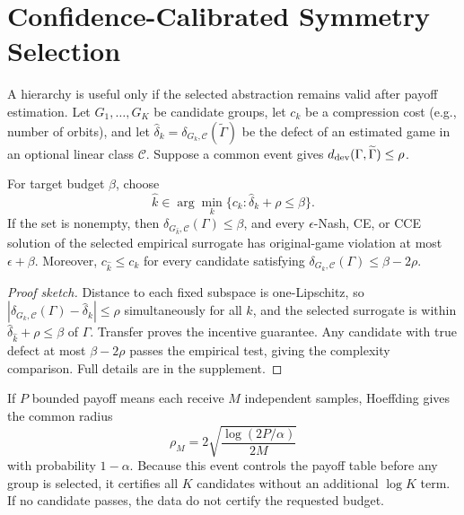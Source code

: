 \section{Confidence-Calibrated Symmetry Selection}

A hierarchy is useful only if the selected abstraction remains valid after payoff estimation.  Let $G_1,\ldots,G_K$ be candidate groups, let $c_k$ be a compression cost (e.g., number of orbits), and let
$\widehat\delta_k=\delta_{G_k,\mathcal C}(\widetilde\Gamma)$ be the defect of an estimated game in an optional linear class $\mathcal C$.  Suppose a common event gives
$d_{\mathrm{dev}}(\Gamma,\widetilde\Gamma)\le\rho$.

\begin{theorem}
\label{thm:group-selection}
For target budget $\beta$, choose
\begin{equation}
\widehat k\in\arg\min_k
\{c_k:\widehat\delta_k+\rho\le\beta\}.
\label{eq:group-selection}
\end{equation}
If the set is nonempty, then
$\delta_{G_{\widehat k},\mathcal C}(\Gamma)\le\beta$, and every $\epsilon$-Nash, CE, or CCE solution of the selected empirical surrogate has original-game violation at most $\epsilon+\beta$.  Moreover,
$c_{\widehat k}\le c_k$ for every candidate satisfying
$\delta_{G_k,\mathcal C}(\Gamma)\le\beta-2\rho$.
\end{theorem}
\begin{proof}[Proof sketch]
Distance to each fixed subspace is one-Lipschitz, so
$|\delta_{G_k,\mathcal C}(\Gamma)-\widehat\delta_k|\le\rho$ simultaneously for all $k$, and the selected surrogate is within $\widehat\delta_{\widehat k}+\rho\le\beta$ of $\Gamma$.  Transfer proves the incentive guarantee.  Any candidate with true defect at most $\beta-2\rho$ passes the empirical test, giving the complexity comparison.  Full details are in the supplement.
\end{proof}

If $P$ bounded payoff means each receive $M$ independent samples, Hoeffding gives the common radius
\begin{equation}
\rho_M=2\sqrt{\frac{\log(2P/\alpha)}{2M}}
\label{eq:selection-radius}
\end{equation}
with probability $1-\alpha$.  Because this event controls the payoff table before any group is selected, it certifies all $K$ candidates without an additional $\log K$ term.  If no candidate passes, the data do not certify the requested budget.

